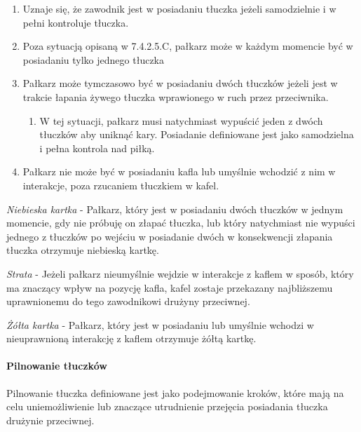 \documentclass[12pt]{article}
\begin{document}
\begin{enumerate}
\item
    Uznaje się, że zawodnik jest w posiadaniu tłuczka jeżeli samodzielnie
  i w pełni kontroluje tłuczka.
  \item
    Poza sytuacją opisaną w 7.4.2.5.C, pałkarz może w każdym momencie być
  w posiadaniu tylko jednego tłuczka
  \item
    Pałkarz może tymczasowo być w posiadaniu dwóch tłuczków jeżeli jest w
  trakcie łapania żywego tłuczka wprawionego w ruch przez przeciwnika.
  
  \begin{enumerate}
  \item
        W tej sytuacji, pałkarz musi natychmiast wypuścić jeden z dwóch
    tłuczków aby uniknąć kary. Posiadanie definiowane jest jako
    samodzielna i pełna kontrola nad piłką.
      \end{enumerate}
\item
    Pałkarz nie może być w posiadaniu kafla lub umyślnie wchodzić z nim w
  interakcje, poza rzucaniem tłuczkiem w kafel.
  \end{enumerate}

\emph{Niebieska kartka} - Pałkarz, który jest w posiadaniu dwóch
tłuczków w jednym momencie, gdy nie próbuję on złapać tłuczka, lub który
natychmiast nie wypuści jednego z tłuczków po wejściu w posiadanie dwóch
w konsekwencji złapania tłuczka otrzymuje niebieską kartkę.

\emph{Strata} - Jeżeli pałkarz nieumyślnie wejdzie w interakcje z kaflem
w sposób, który ma znaczący wpływ na pozycję kafla, kafel zostaje
przekazany najbliższemu uprawnionemu do tego zawodnikowi drużyny
przeciwnej.

\emph{Żółta kartka} - Pałkarz, który jest w posiadaniu lub umyślnie
wchodzi w nieuprawnioną interakcję z kaflem otrzymuje żółtą kartkę.

\paragraph{Pilnowanie tłuczków}
Pilnowanie tłuczka definiowane
jest jako podejmowanie kroków, które mają na celu uniemożliwienie lub
znaczące utrudnienie przejęcia posiadania tłuczka drużynie przeciwnej.
\end{document}
